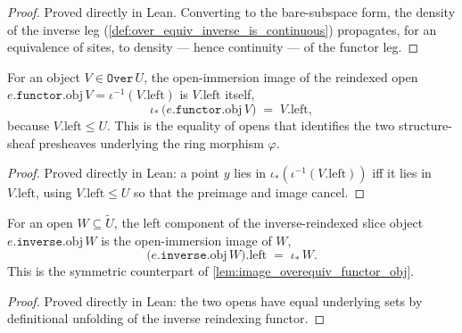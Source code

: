 \begin{proof}
  \leanok
  Proved directly in Lean. Converting to the bare-subspace form, the density of the
  inverse leg (\cref{def:over_equiv_inverse_is_continuous}) propagates, for an
  equivalence of sites, to density --- hence continuity --- of the functor leg.
\end{proof}

\begin{lemma}\leanok
  \label{lem:image_overequiv_functor_obj}
  For an object \(V \in \mathtt{Over}\,U\), the open-immersion image of the
  reindexed open \(e.\mathtt{functor}.\mathrm{obj}\,V = \iota^{-1}(V.\mathrm{left})\)
  is \(V.\mathrm{left}\) itself,
  \[
    \iota_{\ast}\,\bigl(e.\mathtt{functor}.\mathrm{obj}\,V\bigr)
      \;=\; V.\mathrm{left},
  \]
  because \(V.\mathrm{left} \le U\). This is the equality of opens that identifies
  the two structure-sheaf presheaves underlying the ring morphism \(\varphi\).
\end{lemma}

\begin{proof}

\leanok
  Proved directly in Lean: a point \(y\) lies in
  \(\iota_{\ast}(\iota^{-1}(V.\mathrm{left}))\) iff it lies in
  \(V.\mathrm{left}\), using \(V.\mathrm{left} \le U\) so that the preimage and
  image cancel.
\end{proof}

\begin{lemma}\leanok
  \label{lem:left_overequiv_inverse_obj}
  For an open \(W \subseteq \widetilde{U}\), the left component of the
  inverse-reindexed slice object \(e.\mathtt{inverse}.\mathrm{obj}\,W\) is the
  open-immersion image of \(W\),
  \[
    \bigl(e.\mathtt{inverse}.\mathrm{obj}\,W\bigr).\mathrm{left}
      \;=\; \iota_{\ast}\,W .
  \]
  This is the symmetric counterpart of \cref{lem:image_overequiv_functor_obj}.
\end{lemma}

\begin{proof}

\leanok
  Proved directly in Lean: the two opens have equal underlying sets by definitional
  unfolding of the inverse reindexing functor.
\end{proof}

